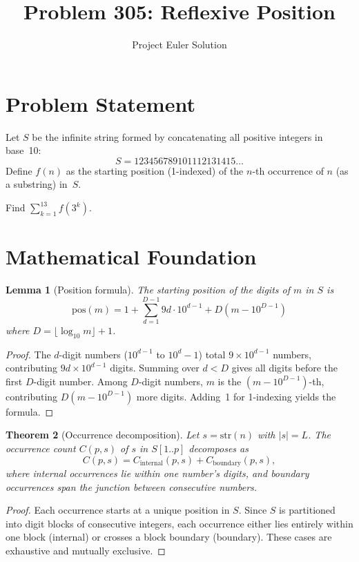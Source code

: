 \documentclass[12pt]{article}
\title{Problem 305: Reflexive Position}
\author{Project Euler Solution}
\date{}
\newtheorem{theorem}{Theorem}
\newtheorem{lemma}[theorem]{Lemma}
\begin{document}
\maketitle

\section{Problem Statement}
Let $S$ be the infinite string formed by concatenating all positive integers in base~10:
\[
S = 123456789101112131415\ldots
\]
Define $f(n)$ as the starting position (1-indexed) of the $n$-th occurrence of $n$ (as a substring) in~$S$.

Find $\displaystyle\sum_{k=1}^{13} f(3^k)$.

\section{Mathematical Foundation}

\begin{lemma}[Position formula]\label{lem:pos}
The starting position of the digits of $m$ in $S$ is
\[
\mathrm{pos}(m) = 1 + \sum_{d=1}^{D-1} 9d \cdot 10^{d-1} + D(m - 10^{D-1})
\]
where $D = \lfloor\log_{10} m\rfloor + 1$.
\end{lemma}

\begin{proof}
The $d$-digit numbers ($10^{d-1}$ to $10^d - 1$) total $9 \times 10^{d-1}$ numbers, contributing $9d \times 10^{d-1}$ digits. Summing over $d < D$ gives all digits before the first $D$-digit number. Among $D$-digit numbers, $m$ is the $(m - 10^{D-1})$-th, contributing $D(m-10^{D-1})$ more digits. Adding~1 for 1-indexing yields the formula.
\end{proof}

\begin{theorem}[Occurrence decomposition]\label{thm:count}
Let $s = \mathrm{str}(n)$ with $|s| = L$. The occurrence count $C(p, s)$ of $s$ in $S[1..p]$ decomposes as
\[
C(p, s) = C_{\mathrm{internal}}(p, s) + C_{\mathrm{boundary}}(p, s),
\]
where internal occurrences lie within one number's digits, and boundary occurrences span the junction between consecutive numbers.
\end{theorem}

\begin{proof}
Each occurrence starts at a unique position in $S$. Since $S$ is partitioned into digit blocks of consecutive integers, each occurrence either lies entirely within one block (internal) or crosses a block boundary (boundary). These cases are exhaustive and mutually exclusive.
\end{proof}
\end{document}
